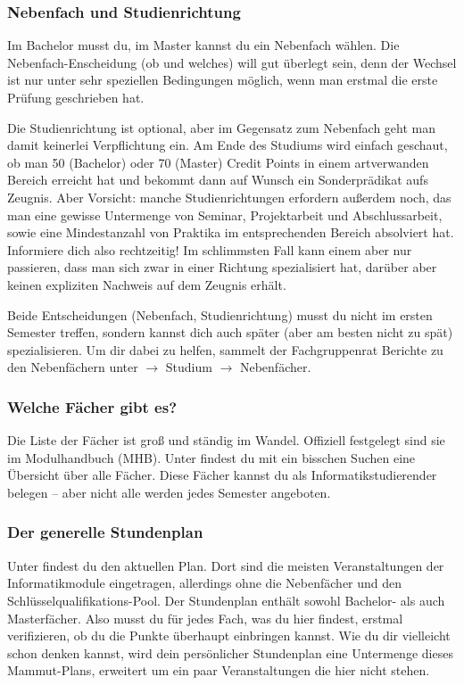 \subsubsection{Nebenfach und Studienrichtung}
\label{nebenfach}
	Im Bachelor musst du, im Master kannst du ein Nebenfach wählen. Die Nebenfach-Enscheidung (ob und welches) will gut überlegt sein, denn der Wechsel ist nur unter sehr speziellen Bedingungen möglich, wenn man erstmal die erste Prüfung geschrieben hat.
 
	Die Studienrichtung ist  optional, aber im Gegensatz zum Nebenfach geht man damit keinerlei Verpflichtung ein. Am Ende des Studiums wird einfach geschaut, ob man 50 (Bachelor) oder 70 (Master) Credit Points in einem artverwanden Bereich erreicht hat und bekommt dann auf Wunsch ein Sonderprädikat aufs Zeugnis. Aber Vorsicht: manche Studienrichtungen erfordern außerdem noch, das man eine gewisse Untermenge von Seminar, Projektarbeit und Abschlussarbeit, sowie eine Mindestanzahl von Praktika im entsprechenden Bereich absolviert hat. Informiere dich also rechtzeitig! Im schlimmsten Fall kann einem aber nur passieren, dass man sich zwar in einer Richtung spezialisiert hat, darüber aber keinen expliziten Nachweis auf dem Zeugnis erhält.

	Beide Entscheidungen (Nebenfach, Studienrichtung) musst du nicht im ersten Semester treffen, sondern kannst dich auch später (aber am besten nicht zu spät) spezialisieren. Um dir dabei zu helfen, sammelt der Fachgruppenrat Berichte zu den Nebenfächern unter \fginfoUrl $\rightarrow$ Studium $\rightarrow$ Nebenfächer.

\subsubsection{Welche Fächer gibt es?}
	Die Liste der Fächer ist groß und ständig im Wandel. Offiziell festgelegt sind sie im Modulhandbuch (MHB). Unter  findest du mit ein bisschen Suchen eine Übersicht über alle Fächer. Diese Fächer kannst du als Informatikstudierender belegen -- aber nicht alle werden jedes Semester angeboten.

\subsubsection{Der generelle Stundenplan}
	Unter  findest du den aktuellen Plan. Dort sind die meisten Veranstaltungen der Informatikmodule eingetragen, allerdings ohne die Nebenfächer und den Schlüsselqualifikations-Pool. Der Stundenplan enthält sowohl Bachelor- als auch Masterfächer. Also musst du für jedes Fach, was du hier findest, erstmal verifizieren, ob du die Punkte überhaupt einbringen kannst. Wie du dir vielleicht schon denken kannst, wird dein persönlicher Stundenplan eine Untermenge dieses Mammut-Plans, erweitert um ein paar Veranstaltungen die hier nicht stehen.


